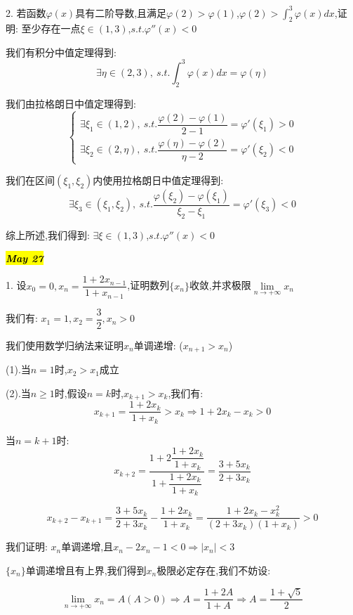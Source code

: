 2. 若函数$\varphi(x)$具有二阶导数,且满足$\varphi(2)>\varphi(1)$,$\varphi(2)>\int_{2}^{3}\varphi(x)dx$,证明: 至少存在一点$\xi\in(1,3)$,$s.t.\varphi ''(x)<0$
\begin{solution}
	
	我们有积分中值定理得到: 
	$$\exists \eta\in(2,3),\ s.t. \int_{2}^{3}\varphi(x)dx=\varphi(\eta)$$
	
	我们由拉格朗日中值定理得到: 
	$$\left\lbrace 
	\begin{array}{l}
		\exists \xi_{1}\in(1,2),\ s.t. \dfrac{\varphi(2)-\varphi(1)}{2-1}=\varphi '(\xi_{1})>0\\
		\exists \xi_{2}\in(2,\eta),\ s.t. \dfrac{\varphi(\eta)-\varphi(2)}{\eta-2}=\varphi '(\xi_{2})<0
	\end{array}
	\right. $$
	
	我们在区间$(\xi_{1},\xi_{2})$内使用拉格朗日中值定理得到: 
	$$\exists \xi_{3}\in(\xi_{1},\xi_{2}),\ s.t. \dfrac{\varphi(\xi_{2})-\varphi(\xi_{1})}{\xi_{2}-\xi_{1}}=\varphi '(\xi_{3})<0$$
	
	综上所述,我们得到: $\exists \xi\in(1,3)$,$s.t.\varphi ''(x)<0$
\end{solution}

\hl{\textbf{\textit{May 27}}}

1. 设$x_{0}=0,x_{n}=\dfrac{1+2x_{n-1}}{1+x_{n-1}}$,证明数列$\{x_{n}\}$收敛,并求极限$\lim\limits_{n\rightarrow +\infty}x_{n}$
\begin{solution}
	
	我们有: $x_{1}=1,x_{2}=\dfrac{3}{2},x_{n}>0$
	
	我们使用数学归纳法来证明$x_{n}$单调递增: ($x_{n+1}>x_{n}$)
	
	(1).当$n=1$时,$x_{2}>x_{1}$成立
	
	(2).当$n\geq 1$时,假设$n=k$时,$x_{k+1}>x_{k}$,我们有: 
	$$x_{k+1}=\dfrac{1+2x_{k}}{1+x_{k}}>x_{k}\Rightarrow 1+2x_{k}-x_{k}>0$$
	
	当$n=k+1$时: 
	$$x_{k+2}=\dfrac{1+2\dfrac{1+2x_{k}}{1+x_{k}}}{1+\dfrac{1+2x_{k}}{1+x_{k}}}=\dfrac{3+5x_{k}}{2+3x_{k}}$$
	
	$$x_{k+2}-x_{k+1}=\dfrac{3+5x_{k}}{2+3x_{k}}-\dfrac{1+2x_{k}}{1+x_{k}}=\dfrac{1+2x_{k}-x_{k}^2}{(2+3x_{k})(1+x_{k})}>0$$
	
	我们证明: $x_{n}$单调递增,且$x_{n}-2x_{n}-1<0\Rightarrow |x_{n}|<3$
	
	$\{x_{n}\}$单调递增且有上界,我们得到$x_{n}$极限必定存在,我们不妨设: 
	
	$$\lim\limits_{n\rightarrow +\infty}x_{n}=A(A>0)\Rightarrow A=\frac{1+2A}{1+A}\Rightarrow A=\dfrac{1+\sqrt{5}}{2}$$
\end{solution}

